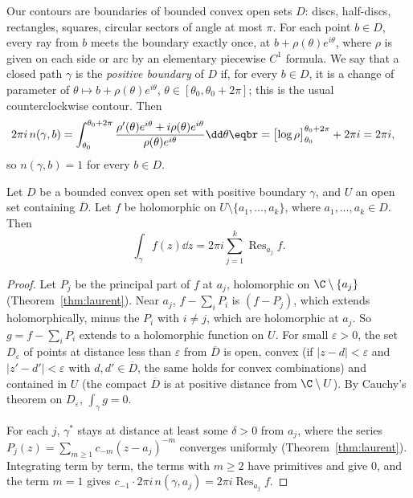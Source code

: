 Our contours are boundaries of bounded convex open sets $D$: discs, half-discs, rectangles, squares, circular sectors of angle
at most $\pi$. For each point $b\in D$, every ray from $b$ meets the boundary exactly once, at $b+\rho(\theta)e^{i\theta}$, where $\rho$ is given on each
side or arc by an elementary piecewise $C^1$ formula. We say that a closed path $\gamma$ is the \emph{positive boundary} of $D$ if, for
every $b\in D$, it is a change of parameter of $\theta\mapsto b+\rho(\theta)e^{i\theta}$, $\theta\in[\theta_0,\theta_0+2\pi]$; this is the usual counterclockwise contour. Then
\[
\begin{aligned}2\pi i\,n(\gamma,b)&=\int_{\theta_0}^{\theta_0+2\pi}\frac{\rho'(\theta)e^{i\theta}+i\rho(\theta)e^{i\theta}}{\rho(\theta)e^{i\theta}}\dd\theta\eqbr=\bigl[\log\rho\bigr]_{\theta_0}^{\theta_0+2\pi}+2\pi i=2\pi i,\end{aligned}
\]
so $n(\gamma,b)=1$ for every $b\in D$.

\begin{theorem}\label{thm:residue}
Let $D$ be a bounded convex open set with positive boundary $\gamma$, and $U$ an open set containing $\overline D$. Let $f$ be holomorphic on
$U\setminus\{a_1,\dots,a_k\}$, where $a_1,\dots,a_k\in D$. Then
\[
\int_\gamma f(z)\dd z=2\pi i\sum_{j=1}^k\operatorname{Res}_{a_j}f.
\]
\end{theorem}
\begin{proof}
Let $P_j$ be the principal part of $f$ at $a_j$, holomorphic on $\C\setminus\{a_j\}$ (Theorem~\ref{thm:laurent}). Near $a_j$, $f-\sum_iP_i$ is $(f-P_j)$, which extends
holomorphically, minus the $P_i$ with $i\ne j$, which are holomorphic at $a_j$. So $g=f-\sum_iP_i$ extends to a holomorphic function on $U$.
For small $\varepsilon>0$, the set $D_\varepsilon$ of points at distance less than $\varepsilon$ from $\overline D$ is open, convex (if $|z-d|<\varepsilon$ and $|z'-d'|<\varepsilon$ with
$d,d'\in\overline D$, the same holds for convex combinations) and contained in $U$ (the compact $\overline D$ is at positive distance from $\C\setminus U$).
By Cauchy's theorem on $D_\varepsilon$, $\int_\gamma g=0$.

For each $j$, $\gamma^*$ stays at distance at least some $\delta>0$ from $a_j$, where the series $P_j(z)=\sum_{m\ge1}c_{-m}(z-a_j)^{-m}$ converges uniformly
(Theorem~\ref{thm:laurent}). Integrating term by term, the terms with $m\ge2$ have primitives and give $0$, and the term $m=1$ gives
$c_{-1}\cdot2\pi i\,n(\gamma,a_j)=2\pi i\operatorname{Res}_{a_j}f$.
\end{proof}

